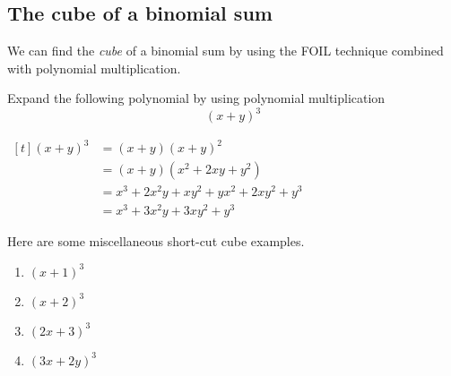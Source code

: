 \subsection{The cube of a binomial sum}
We can find the \emph{cube} of a binomial sum by using the FOIL technique combined 
with polynomial multiplication.
\begin{myexample}
Expand the following polynomial by using polynomial multiplication
\[
	(x+y)^3
\]
\end{myexample}
\begin{myProof}
$
\begin{aligned}[t]
(x+y)^3 & = (x+y)(x+y)^2\\
& = (x+y)(x^2+2xy+y^2)\\
& = x^3+2x^2y+xy^2 + yx^2 + 2xy^2 + y^3\\
& = x^3 + 3x^2y + 3 xy^2 + y^3
\end{aligned}
$
\end{myProof}
\begin{myexample}
Here are some miscellaneous short-cut cube examples.
\drillandskill
\end{myexample}
\begin{myProof}				
		\begin{enumerate}
			\item $(x+1)^3$
			\item $(x+2)^3$
			\item $(2x+3)^3$
			\item $(3x+2y)^3$
		\end{enumerate}
\end{myProof} 

